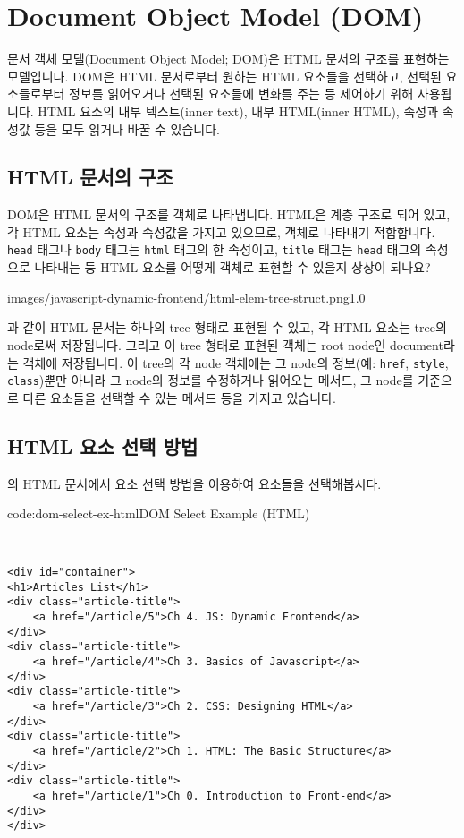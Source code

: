 \section{Document Object Model (DOM)} \label{sect:document-object-model}

문서 객체 모델(Document Object Model; DOM)은 HTML 문서의 구조를 표현하는 모델입니다. DOM은 HTML 문서로부터 원하는 HTML 요소들을 선택하고, 선택된 요소들로부터 정보를 읽어오거나 선택된 요소들에 변화를 주는 등 제어하기 위해 사용됩니다. HTML 요소의 내부 텍스트(inner text), 내부 HTML(inner HTML), 속성과 속성값 등을 모두 읽거나 바꿀 수 있습니다. 

\subsection*{HTML 문서의 구조}

DOM은 HTML 문서의 구조를 객체로 나타냅니다. HTML은 계층 구조로 되어 있고, 각 HTML 요소는 속성과 속성값을 가지고 있으므로, 객체로 나타내기 적합합니다. \texttt{head} 태그나 \texttt{body} 태그는 \texttt{html} 태그의 한 속성이고, \texttt{title} 태그는 \texttt{head} 태그의 속성으로 나타내는 등 HTML 요소를 어떻게 객체로 표현할 수 있을지 상상이 되나요? 

    {images/javascript-dynamic-frontend/html-elem-tree-struct.png}{1.0}

과 같이 HTML 문서는 하나의 tree 형태로 표현될 수 있고, 각 HTML 요소는 tree의 node로써 저장됩니다. 그리고 이 tree 형태로 표현된 객체는 root node인 document라는 객체에 저장됩니다. 이 tree의 각 node 객체에는 그 node의 정보(예: \texttt{href}, \texttt{style}, \texttt{class})뿐만 아니라 그 node의 정보를 수정하거나 읽어오는 메서드, 그 node를 기준으로 다른 요소들을 선택할 수 있는 메서드 등을 가지고 있습니다. 

\subsection*{HTML 요소 선택 방법}

의 HTML 문서에서 요소 선택 방법을 이용하여 요소들을 선택해봅시다.

\begin{codeenv}{code:dom-select-ex-html}{DOM Select Example (HTML)}\begin{verbatim}


<div id="container">
<h1>Articles List</h1>
<div class="article-title">
    <a href="/article/5">Ch 4. JS: Dynamic Frontend</a>
</div>
<div class="article-title">
    <a href="/article/4">Ch 3. Basics of Javascript</a>
</div>
<div class="article-title">
    <a href="/article/3">Ch 2. CSS: Designing HTML</a>
</div>
<div class="article-title">
    <a href="/article/2">Ch 1. HTML: The Basic Structure</a>
</div>
<div class="article-title">
    <a href="/article/1">Ch 0. Introduction to Front-end</a>
</div>
</div>
\end{verbatim}
\end{codeenv}

